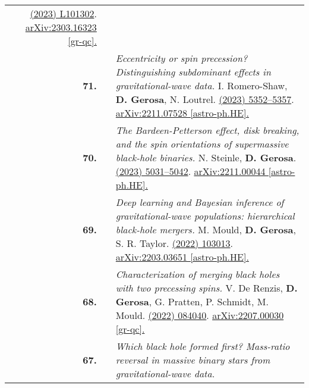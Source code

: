 {\begin{longtable}{rp{0.3cm}p{15.8cm}}
\newline{}
\href{https://journals.aps.org/prd/abstract/10.1103/PhysRevD.107.L101302}{\prdl 107 (2023) L101302}. \href{https://arxiv.org/abs/2303.16323}{arXiv:2303.16323 [gr-qc].}
\vspace{0.09cm}\\
%
\textbf{71.} & & \textit{Eccentricity or spin precession? Distinguishing subdominant effects in gravitational-wave data.}
\newline{}
I. Romero-Shaw, \textbf{D. Gerosa}, N. Loutrel.
\newline{}
\href{https://doi.org/10.1093/mnras/stad031}{\mnras 519 (2023) 5352–5357}. \href{https://arxiv.org/abs/2211.07528}{arXiv:2211.07528 [astro-ph.HE].}
\vspace{0.09cm}\\
%
\textbf{70.} & & \textit{The Bardeen-Petterson effect, disk breaking, and the spin orientations of supermassive black-hole binaries.}
\newline{}
N. Steinle, \textbf{D. Gerosa}.
\newline{}
\href{https://doi.org/10.1093/mnras/stac3821}{\mnras 519 (2023) 5031–5042}. \href{https://arxiv.org/abs/2211.00044}{arXiv:2211.00044 [astro-ph.HE].}
\vspace{0.09cm}\\
%
\textbf{69.} & & \textit{Deep learning and Bayesian inference of gravitational-wave populations: hierarchical black-hole mergers.}
\newline{}
M. Mould, \textbf{D. Gerosa}, S. R. Taylor.
\newline{}
\href{https://journals.aps.org/prd/abstract/10.1103/PhysRevD.106.103013}{\prd 106 (2022) 103013}. \href{https://arxiv.org/abs/2203.03651}{arXiv:2203.03651 [astro-ph.HE].}
\vspace{0.09cm}\\
%
\textbf{68.} & & \textit{Characterization of merging black holes with two precessing spins.}
\newline{}
V. De Renzis, \textbf{D. Gerosa}, G. Pratten, P. Schmidt, M. Mould.
\newline{}
\href{https://journals.aps.org/prd/abstract/10.1103/PhysRevD.106.084040}{\prd 106 (2022) 084040}. \href{https://arxiv.org/abs/2207.00030}{arXiv:2207.00030 [gr-qc].}
\vspace{0.09cm}\\
%
\textbf{67.} & & \textit{Which black hole formed first? Mass-ratio reversal in massive binary stars from gravitational-wave data.}
\newline{}

\end{longtable}}
